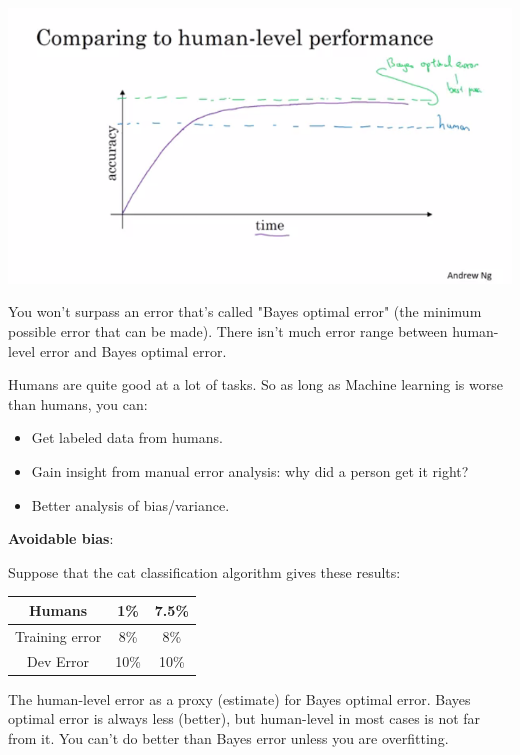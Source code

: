 \documentclass{article}
\begin{document}
\begin{center}
\includegraphics[scale=0.6]{./images/human_level_performance.png}
\end{center}

\noindent You won't surpass an error that's called "Bayes optimal error" (the minimum possible error that can be made). There isn't much error range between human-level error and Bayes optimal error.

\bigskip

\noindent Humans are quite good at a lot of tasks. So as long as Machine learning is worse than humans, you can:

\begin{itemize}
    \item Get labeled data from humans.
    \item Gain insight from manual error analysis: why did a person get it right?
    \item Better analysis of bias/variance.
\end{itemize}

\noindent \textbf{Avoidable bias}:

\noindent Suppose that the cat classification algorithm gives these results:

\begin{center}
\begin{tabular}{ |c|c|c| } 
 \hline
 Humans & 1\% & 7.5\% \\ 
 \hline
 Training error & 8\% & 8\% \\ 
 \hline
 Dev Error & 10\% & 10\%	 \\ 
 \hline
\end{tabular}
\end{center}

\noindent The human-level error as a proxy (estimate) for Bayes optimal error. Bayes optimal error is always less (better), but human-level in most cases is not far from it. You can't do better than Bayes error unless you are overfitting.
\end{document}
